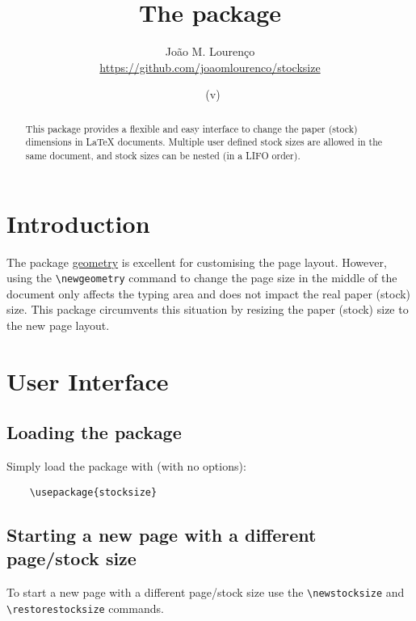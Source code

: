 \documentclass[12pt,a4paper,article]{article}
\begin{document}
 
  
  \title{The \textsf{\filename} package}
  \author{João M. Lourenço\\\url{https://github.com/joaomlourenco/stocksize}}
  \date{\filedate\ (v\fileversion)}
  
  \maketitle
  
  \begin{abstract}
    This package provides a flexible and easy interface to change the paper (stock) dimensions in LaTeX documents.
    Multiple user defined stock sizes are allowed in the same document, and stock sizes can be nested (in a LIFO order).
  \end{abstract}

\section{Introduction}

  The package 
    \href{https://github.com/davidcarlisle/geometry}{geometry} 
is excellent for customising the page layout. However, using the \verb!\newgeometry! command to change the page size in the middle of the document only affects the typing area and does not impact the real paper (stock) size. This package circumvents this situation by resizing the paper (stock) size to the new page layout.

\section{User Interface}
  
\subsection{Loading the package}
  
  Simply load the package with (with no options):
  
  \begin{verbatim}
    \usepackage{stocksize}
  \end{verbatim}
  
\subsection{Starting a new page with a different page/stock size}
  
To start a new page with a different page/stock size use the \verb!\newstocksize! and \verb!\restorestocksize! commands.
  
\end{document}
